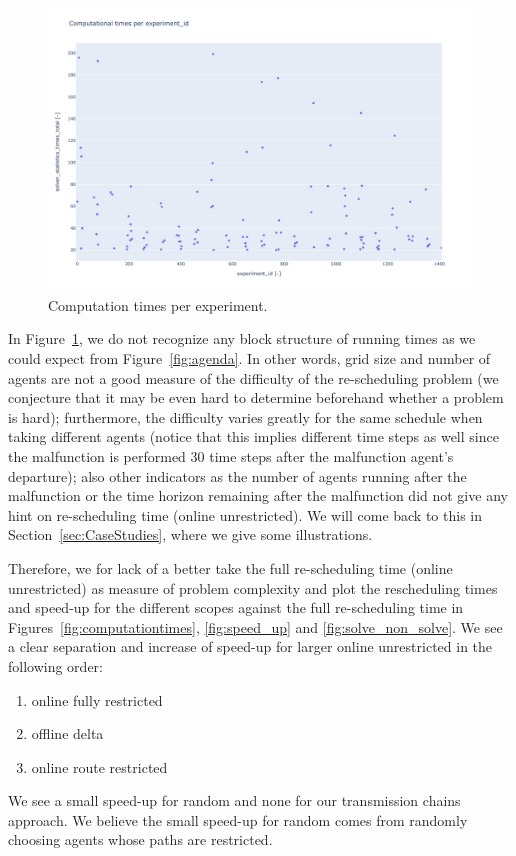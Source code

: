 \documentclass{article}
\begin{document}
\begin{figure}[hbtp]
    \includegraphics[width=\textwidth]{Figures/04_computational_results/times_total_per_experiment_id.pdf}
	\caption{Computation times per experiment.}
	\label{fig:computationtimesexperimentid}
\end{figure}
In Figure~\ref{fig:computationtimesexperimentid}, we do not recognize any block structure of running times as we could expect from Figure~\ref{fig:agenda}. In other words, grid size and number of agents are not a good measure of the difficulty of the re-scheduling problem (we conjecture that it may be even hard to determine beforehand whether a problem is hard); furthermore, the difficulty varies greatly for the same schedule when taking different agents (notice that this implies different time steps as well since the malfunction is performed 30 time steps after the malfunction agent's departure); also other indicators as the number of agents running after the malfunction or the time horizon remaining after the malfunction did not give any hint on re-scheduling time (online unrestricted). We will come back to this in Section~\ref{sec:CaseStudies}, where we give some illustrations.

Therefore, we for lack of a better take the full re-scheduling time (online unrestricted) as measure of problem complexity and plot the rescheduling times and speed-up for the different scopes against the full re-scheduling time in Figures~\ref{fig:computationtimes}, \ref{fig:speed_up} and \ref{fig:solve_non_solve}.
We see a clear separation and increase of speed-up for larger online unrestricted in the following order:
\begin{enumerate}
    \item online fully restricted
    \item offline delta
    \item online route restricted
\end{enumerate}
We see a small speed-up for random and none for our transmission chains approach. We believe the small speed-up for random comes from randomly choosing agents whose paths are restricted.
\end{document}
